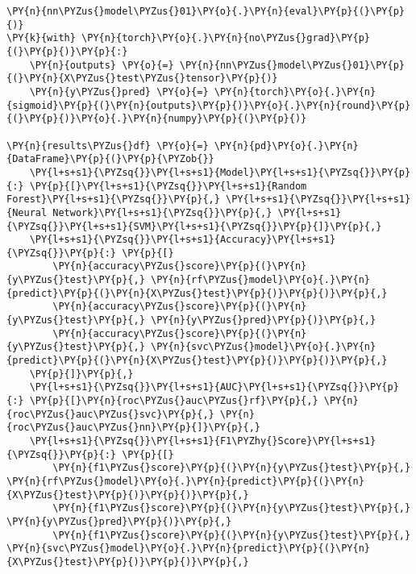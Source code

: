     \begin{tcolorbox}[breakable, size=fbox, boxrule=1pt, pad at break*=1mm,colback=cellbackground, colframe=cellborder]
\begin{Verbatim}[commandchars=\\\{\}]
\PY{n}{nn\PYZus{}model\PYZus{}01}\PY{o}{.}\PY{n}{eval}\PY{p}{(}\PY{p}{)}
\PY{k}{with} \PY{n}{torch}\PY{o}{.}\PY{n}{no\PYZus{}grad}\PY{p}{(}\PY{p}{)}\PY{p}{:}
    \PY{n}{outputs} \PY{o}{=} \PY{n}{nn\PYZus{}model\PYZus{}01}\PY{p}{(}\PY{n}{X\PYZus{}test\PYZus{}tensor}\PY{p}{)}
    \PY{n}{y\PYZus{}pred} \PY{o}{=} \PY{n}{torch}\PY{o}{.}\PY{n}{sigmoid}\PY{p}{(}\PY{n}{outputs}\PY{p}{)}\PY{o}{.}\PY{n}{round}\PY{p}{(}\PY{p}{)}\PY{o}{.}\PY{n}{numpy}\PY{p}{(}\PY{p}{)}

\PY{n}{results\PYZus{}df} \PY{o}{=} \PY{n}{pd}\PY{o}{.}\PY{n}{DataFrame}\PY{p}{(}\PY{p}{\PYZob{}}
    \PY{l+s+s1}{\PYZsq{}}\PY{l+s+s1}{Model}\PY{l+s+s1}{\PYZsq{}}\PY{p}{:} \PY{p}{[}\PY{l+s+s1}{\PYZsq{}}\PY{l+s+s1}{Random Forest}\PY{l+s+s1}{\PYZsq{}}\PY{p}{,} \PY{l+s+s1}{\PYZsq{}}\PY{l+s+s1}{Neural Network}\PY{l+s+s1}{\PYZsq{}}\PY{p}{,} \PY{l+s+s1}{\PYZsq{}}\PY{l+s+s1}{SVM}\PY{l+s+s1}{\PYZsq{}}\PY{p}{]}\PY{p}{,}
    \PY{l+s+s1}{\PYZsq{}}\PY{l+s+s1}{Accuracy}\PY{l+s+s1}{\PYZsq{}}\PY{p}{:} \PY{p}{[}
        \PY{n}{accuracy\PYZus{}score}\PY{p}{(}\PY{n}{y\PYZus{}test}\PY{p}{,} \PY{n}{rf\PYZus{}model}\PY{o}{.}\PY{n}{predict}\PY{p}{(}\PY{n}{X\PYZus{}test}\PY{p}{)}\PY{p}{)}\PY{p}{,}
        \PY{n}{accuracy\PYZus{}score}\PY{p}{(}\PY{n}{y\PYZus{}test}\PY{p}{,} \PY{n}{y\PYZus{}pred}\PY{p}{)}\PY{p}{,}
        \PY{n}{accuracy\PYZus{}score}\PY{p}{(}\PY{n}{y\PYZus{}test}\PY{p}{,} \PY{n}{svc\PYZus{}model}\PY{o}{.}\PY{n}{predict}\PY{p}{(}\PY{n}{X\PYZus{}test}\PY{p}{)}\PY{p}{)}\PY{p}{,}
    \PY{p}{]}\PY{p}{,}
    \PY{l+s+s1}{\PYZsq{}}\PY{l+s+s1}{AUC}\PY{l+s+s1}{\PYZsq{}}\PY{p}{:} \PY{p}{[}\PY{n}{roc\PYZus{}auc\PYZus{}rf}\PY{p}{,} \PY{n}{roc\PYZus{}auc\PYZus{}svc}\PY{p}{,} \PY{n}{roc\PYZus{}auc\PYZus{}nn}\PY{p}{]}\PY{p}{,}
    \PY{l+s+s1}{\PYZsq{}}\PY{l+s+s1}{F1\PYZhy{}Score}\PY{l+s+s1}{\PYZsq{}}\PY{p}{:} \PY{p}{[}
        \PY{n}{f1\PYZus{}score}\PY{p}{(}\PY{n}{y\PYZus{}test}\PY{p}{,} \PY{n}{rf\PYZus{}model}\PY{o}{.}\PY{n}{predict}\PY{p}{(}\PY{n}{X\PYZus{}test}\PY{p}{)}\PY{p}{)}\PY{p}{,}
        \PY{n}{f1\PYZus{}score}\PY{p}{(}\PY{n}{y\PYZus{}test}\PY{p}{,} \PY{n}{y\PYZus{}pred}\PY{p}{)}\PY{p}{,}
        \PY{n}{f1\PYZus{}score}\PY{p}{(}\PY{n}{y\PYZus{}test}\PY{p}{,} \PY{n}{svc\PYZus{}model}\PY{o}{.}\PY{n}{predict}\PY{p}{(}\PY{n}{X\PYZus{}test}\PY{p}{)}\PY{p}{)}\PY{p}{,}

\end{Verbatim}
\end{tcolorbox}
